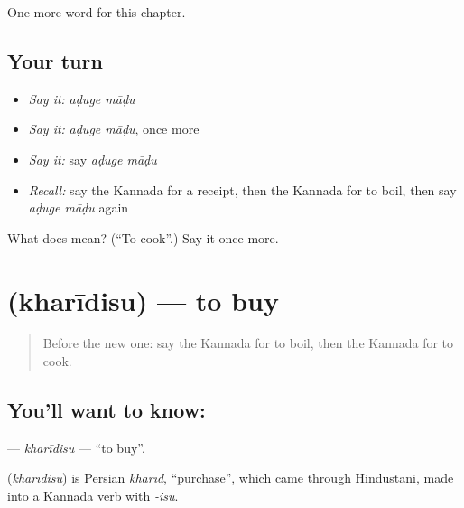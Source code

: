 \begin{grammarlens}[title={What you've built}]
One more word for this chapter.
\end{grammarlens}

\subsection*{Your turn}
\begin{itemize}
\raggedright
  \item \emph{Say it:} \emph{aḍuge māḍu}
  \item \emph{Say it:} \emph{aḍuge māḍu}, once more
  \item \emph{Say it:} say \emph{aḍuge māḍu}
  \item \emph{Recall:} say the Kannada for a receipt, then the Kannada for to boil, then say \emph{aḍuge māḍu} again
\end{itemize}

\begin{tcolorbox}[breakable,colback=teal!4,colframe=teal!35!black,title={Before you move on}]
What does   mean? (\textquotedblleft{}To cook\textquotedblright{}.) Say it once more.
\end{tcolorbox}
\section[\texorpdfstring{\kn{ಖರೀದಿಸು} (kharīdisu)}{ಖರೀದಿಸು (kharīdisu)}]{ (kharīdisu) — to buy}

\label{lesson:KA-C158-kharidisu}



\begin{quote}
Before the new one: say the Kannada for to boil, then the Kannada for to cook.
\end{quote}

\subsection*{You'll want to know: }
\textbf{} — \emph{kharīdisu} — \textquotedblleft{}to buy\textquotedblright{}.

\begin{cousinweb}
\textbf{} (\emph{kharīdisu}) is Persian \emph{kharīd}, \textquotedblleft{}purchase\textquotedblright{}, which came through Hindustani, made into a Kannada verb with \emph{-isu}.
\end{cousinweb}

